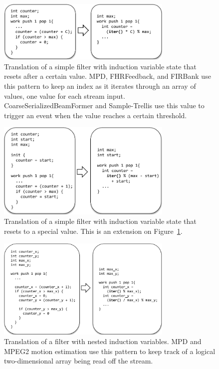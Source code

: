 \begin{figure}[t]
\includegraphics[width=3.3in]{figures/transformation1.pdf}
\caption{Translation of a simple filter with induction variable state that resets after a certain value.  MPD, FHRFeedback, and FIRBank use this pattern to keep an index as it iterates through an array of values, one value for each stream input.  CoarseSerializedBeamFormer and Sample-Trellis use this value to trigger an event when the value reaches a certain threshold.
 \protect\label{fig:transform-after-simple}}
\end{figure}

\begin{figure}[t]
\includegraphics[width=3.3in]{figures/transformation2.pdf}
\caption{Translation of a simple filter with induction variable state that resets to a special value.  This is an extension on Figure~\ref{fig:transform-after-simple}.  \protect\label{fig:transform-after-start}}
\end{figure}

\begin{figure}[t]
\includegraphics[width=3.3in]{figures/transformation3.pdf}
\caption{Translation of a filter with nested induction variables. MPD and MPEG2 motion estimation use this pattern to keep track of a logical two-dimensional array being read off the stream.  \protect\label{fig:transform-after-twonested}}
\end{figure}


